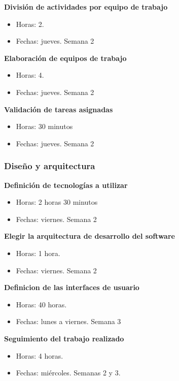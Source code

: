 \documentclass[paper=a4, fontsize=11pt, spanish]{scrartcl}
\numberwithin{equation}{section} %
\numberwithin{figure}{section} %
\numberwithin{table}{section} %
\begin{document}
\textbf{División de actividades por equipo de trabajo}
 \begin{itemize}
   \item Horas: 2. 
   \item Fechas: jueves. Semana 2
 \end{itemize}

 \textbf{Elaboración de equipos de trabajo}
 \begin{itemize}
   \item Horas: 4.
   \item Fechas: jueves. Semana 2
 \end{itemize}

 \textbf{Validación de tareas asignadas}
 \begin{itemize}
   \item Horas: 30 minutos
   \item Fechas: jueves. Semana 2
 \end{itemize}
 
\subsubsection{Diseño y arquitectura}

\textbf{Definición de tecnologías a utilizar}
 \begin{itemize}
   \item Horas: 2 horas 30 minutos 
   \item Fechas: viernes. Semana 2
 \end{itemize}

\textbf{ Elegir la arquitectura de desarrollo del software}
 \begin{itemize}
   \item Horas: 1 hora. 
   \item Fechas: viernes. Semana 2
 \end{itemize}

 \textbf{Definicion de las interfaces de usuario}
 \begin{itemize}
   \item Horas: 40 horas.
   \item Fechas: lunes a viernes. Semana 3
 \end{itemize}

 \textbf{Seguimiento del trabajo realizado}
 \begin{itemize}
   \item Horas: 4 horas.
   \item Fechas: miércoles. Semanas 2 y 3.
 \end{itemize}
\end{document}
